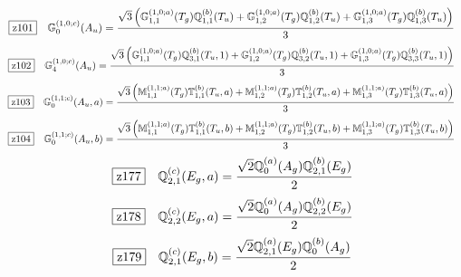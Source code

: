 \documentclass[fleqn,10pt,landscape]{jsarticle}
\begin{document}
\begin{dmath*}
\hspace*{3mm}\fbox{z101}\quad \mathbb{G}_{0}^{(1,0;c)}(A_{u})=\frac{\sqrt{3} \left(\mathbb{G}_{1,1}^{(1,0;a)}(T_{g}) \mathbb{Q}_{1,1}^{(b)}(T_{u}) + \mathbb{G}_{1,2}^{(1,0;a)}(T_{g}) \mathbb{Q}_{1,2}^{(b)}(T_{u}) + \mathbb{G}_{1,3}^{(1,0;a)}(T_{g}) \mathbb{Q}_{1,3}^{(b)}(T_{u})\right)}{3}
\end{dmath*}
\begin{dmath*}
\hspace*{3mm}\fbox{z102}\quad \mathbb{G}_{4}^{(1,0;c)}(A_{u})=\frac{\sqrt{3} \left(\mathbb{G}_{1,1}^{(1,0;a)}(T_{g}) \mathbb{Q}_{3,1}^{(b)}(T_{u},1) + \mathbb{G}_{1,2}^{(1,0;a)}(T_{g}) \mathbb{Q}_{3,2}^{(b)}(T_{u},1) + \mathbb{G}_{1,3}^{(1,0;a)}(T_{g}) \mathbb{Q}_{3,3}^{(b)}(T_{u},1)\right)}{3}
\end{dmath*}
\begin{dmath*}
\hspace*{3mm}\fbox{z103}\quad \mathbb{G}_{0}^{(1,1;c)}(A_{u},a)=\frac{\sqrt{3} \left(\mathbb{M}_{1,1}^{(1,1;a)}(T_{g}) \mathbb{T}_{1,1}^{(b)}(T_{u},a) + \mathbb{M}_{1,2}^{(1,1;a)}(T_{g}) \mathbb{T}_{1,2}^{(b)}(T_{u},a) + \mathbb{M}_{1,3}^{(1,1;a)}(T_{g}) \mathbb{T}_{1,3}^{(b)}(T_{u},a)\right)}{3}
\end{dmath*}
\begin{dmath*}
\hspace*{3mm}\fbox{z104}\quad \mathbb{G}_{0}^{(1,1;c)}(A_{u},b)=\frac{\sqrt{3} \left(\mathbb{M}_{1,1}^{(1,1;a)}(T_{g}) \mathbb{T}_{1,1}^{(b)}(T_{u},b) + \mathbb{M}_{1,2}^{(1,1;a)}(T_{g}) \mathbb{T}_{1,2}^{(b)}(T_{u},b) + \mathbb{M}_{1,3}^{(1,1;a)}(T_{g}) \mathbb{T}_{1,3}^{(b)}(T_{u},b)\right)}{3}
\end{dmath*}
\begin{dmath*}
\hspace*{3mm}\fbox{z177}\quad \mathbb{Q}_{2,1}^{(c)}(E_{g},a)=\frac{\sqrt{2} \mathbb{Q}_{0}^{(a)}(A_{g}) \mathbb{Q}_{2,1}^{(b)}(E_{g})}{2}
\end{dmath*}
\begin{dmath*}
\hspace*{3mm}\fbox{z178}\quad \mathbb{Q}_{2,2}^{(c)}(E_{g},a)=\frac{\sqrt{2} \mathbb{Q}_{0}^{(a)}(A_{g}) \mathbb{Q}_{2,2}^{(b)}(E_{g})}{2}
\end{dmath*}
\begin{dmath*}
\hspace*{3mm}\fbox{z179}\quad \mathbb{Q}_{2,1}^{(c)}(E_{g},b)=\frac{\sqrt{2} \mathbb{Q}_{2,1}^{(a)}(E_{g}) \mathbb{Q}_{0}^{(b)}(A_{g})}{2}
\end{dmath*}
\end{document}
